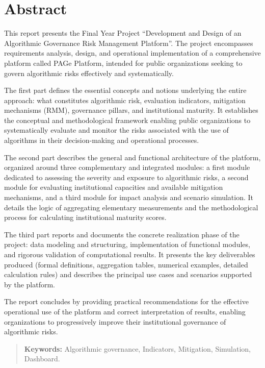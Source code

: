 \chapter*{Abstract}
\thispagestyle{plain}

This report presents the Final Year Project ``Development and Design of an Algorithmic Governance Risk Management Platform''. The project encompasses requirements analysis, design, and operational implementation of a comprehensive platform called PAGe Platform, intended for public organizations seeking to govern algorithmic risks effectively and systematically.

The first part defines the essential concepts and notions underlying the entire approach: what constitutes algorithmic risk, evaluation indicators, mitigation mechanisms (RMM), governance pillars, and institutional maturity. It establishes the conceptual and methodological framework enabling public organizations to systematically evaluate and monitor the risks associated with the use of algorithms in their decision-making and operational processes.

The second part describes the general and functional architecture of the platform, organized around three complementary and integrated modules: a first module dedicated to assessing the severity and exposure to algorithmic risks, a second module for evaluating institutional capacities and available mitigation mechanisms, and a third module for impact analysis and scenario simulation. It details the logic of aggregating elementary measurements and the methodological process for calculating institutional maturity scores.

The third part reports and documents the concrete realization phase of the project: data modeling and structuring, implementation of functional modules, and rigorous validation of computational results. It presents the key deliverables produced (formal definitions, aggregation tables, numerical examples, detailed calculation rules) and describes the principal use cases and scenarios supported by the platform.

The report concludes by providing practical recommendations for the effective operational use of the platform and correct interpretation of results, enabling organizations to progressively improve their institutional governance of algorithmic risks.
\vspace{6cm}
\begin{quote}
\textbf{Keywords:} Algorithmic governance, Indicators, Mitigation, Simulation, Dashboard.
\end{quote}
